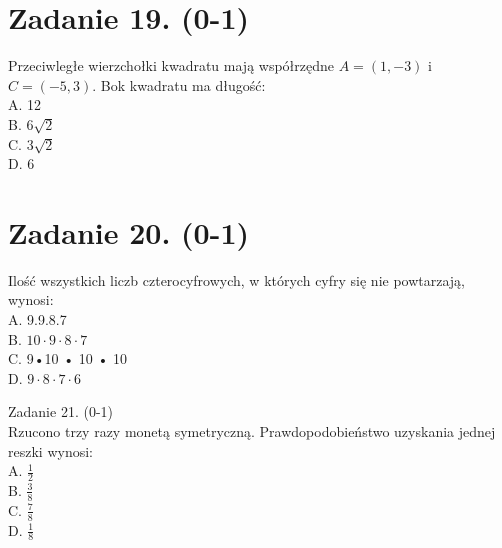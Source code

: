 \documentclass[10pt]{article}
\begin{document}
\section*{Zadanie 19. (0-1)}
Przeciwległe wierzchołki kwadratu mają współrzędne \(A=(1,-3)\) i \(C=(-5,3)\). Bok kwadratu ma długość:\\
A. 12\\
B. \(6 \sqrt{2}\)\\
C. \(3 \sqrt{2}\)\\
D. 6

\section*{Zadanie 20. (0-1)}
Ilość wszystkich liczb czterocyfrowych, w których cyfry się nie powtarzają, wynosi:\\
A. 9.9.8.7\\
B. \(10 \cdot 9 \cdot 8 \cdot 7\)\\
C. 9•10 • 10 • 10\\
D. \(9 \cdot 8 \cdot 7 \cdot 6\)

Zadanie 21. (0-1)\\
Rzucono trzy razy monetą symetryczną. Prawdopodobieństwo uzyskania jednej reszki wynosi:\\
A. \(\frac{1}{2}\)\\
B. \(\frac{3}{8}\)\\
C. \(\frac{7}{8}\)\\
D. \(\frac{1}{8}\)
\end{document}
